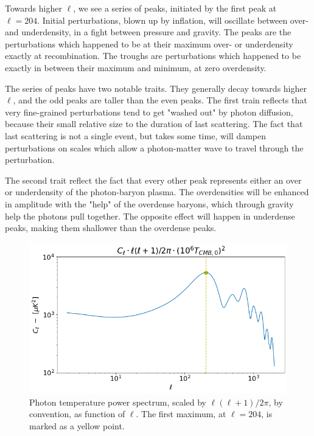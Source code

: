 \documentclass[10pt, a4paper]{article}
\begin{document}
Towards higher $\ell$, we see a series of peaks, initiated by the first peak at $\ell = 204$. Initial perturbations, blown up by inflation, will oscillate between over- and underdensity, in a fight between pressure and gravity. The peaks are the perturbations which happened to be at their maximum over- or underdensity exactly at recombination. The troughs are perturbations which happened to be exactly in between their maximum and minimum, at zero overdensity.

The series of peaks have two notable traits. They generally decay towards higher $\ell$, and the odd peaks are taller than the even peaks. The first train reflects that very fine-grained perturbations tend to get "washed out" by photon diffusion, because their small relative size to the duration of last scattering. The fact that last scattering is not a single event, but takes some time, will dampen perturbations on scales which allow a photon-matter wave to travel through the perturbation.

The second trait reflect the fact that every other peak represents either an over or underdensity of the photon-baryon plasma. The overdensities will be enhanced in amplitude with the "help" of the overdense baryons, which through gravity help the photons pull together. The opposite effect will happen in underdense peaks, making them shallower than the overdense peaks.

\begin{figure}[H]
    \centering
    \includegraphics[scale=0.5]{../m4_figs/Cell.png}
    \caption{Photon temperature power spectrum, scaled by $\ell(\ell+1)/2\pi$, by convention, as function of $\ell$. The first maximum, at $\ell = 204$, is marked as a yellow point.}
    \label{fig:Cell}
\end{figure}
\end{document}
